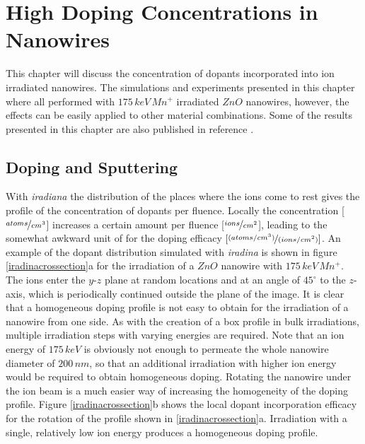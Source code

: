 \chapter{High Doping Concentrations in Nanowires}
\label{sec:high}

This chapter will discuss the concentration of dopants incorporated into ion irradiated nanowires. The simulations and experiments presented in this chapter where all performed with $175\, keV\,Mn^+$ irradiated $ZnO$ nanowires, however, the effects can be easily applied to other material combinations. Some of the results presented in this chapter are also published in reference \cite{johannes_enhanced_2014}.

\section{Doping and Sputtering}

With \emph{iradiana} the distribution of the places where the ions come to rest gives the profile of the concentration of dopants per fluence. Locally the concentration [$\nicefrac{atoms}{cm^{3}}$] increases a certain amount per fluence [$\nicefrac{ions}{cm^{2}}$], leading to the somewhat awkward unit of for the doping efficacy $[\nicefrac{(atoms/cm^{3})}{(ions/cm^{2})}]$. An example of the dopant distribution simulated with \emph{iradina} is shown in figure \ref{iradinacrossection}a for the irradiation of a $ZnO$ nanowire with $175\,keV\,Mn^+$. The ions enter the $y$-$z$ plane at random locations and at an angle of $45^\circ$ to the $z$-axis, which is periodically continued outside the plane of the image. It is clear that a homogeneous doping profile is not easy to obtain for the irradiation of a nanowire from one side. As with the creation of a box profile in bulk irradiations, multiple irradiation steps with varying energies are required. Note that an ion energy of $175\,keV$ is obviously not enough to permeate the whole nanowire diameter of $200\,nm$, so that an additional irradiation with higher ion energy would be required to obtain homogeneous doping. Rotating the nanowire under the ion beam is a much easier way of increasing the homogeneity of the doping profile. Figure \ref{iradinacrossection}b shows the local dopant incorporation efficacy for the rotation of the profile shown in \ref{iradinacrossection}a. Irradiation with a single, relatively low ion energy produces a homogeneous doping profile. 
  
